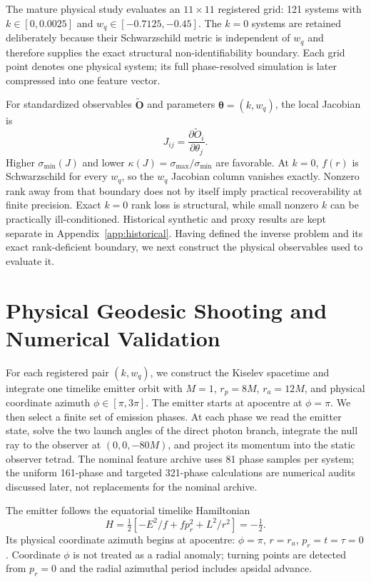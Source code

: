\documentclass[11pt]{article}
\newcommand{\wq}{w_q}
\newcommand{\smin}{\sigma_{\min}}
\newcommand{\kappaJ}{\kappa(J)}
\begin{document}
The mature physical study evaluates an $11\times11$ registered grid: 121
systems with $k\in[0,0.0025]$ and
$\wq\in[-0.7125,-0.45]$. The $k=0$ systems are retained deliberately because
their Schwarzschild metric is independent of $\wq$ and therefore supplies the
exact structural non-identifiability boundary. Each grid point denotes one
physical system; its full phase-resolved simulation is later compressed into
one feature vector.

For standardized observables $\tilde{\mathbf O}$ and parameters
$\boldsymbol\theta=(k,\wq)$, the local Jacobian is
\begin{equation}
 J_{ij}=\frac{\partial\tilde O_i}{\partial\theta_j}.
\end{equation}
Higher $\smin(J)$ and lower $\kappaJ=\sigma_{\max}/\smin$ are favorable. At
$k=0$, $f(r)$ is Schwarzschild for every $\wq$, so the $\wq$ Jacobian column
vanishes exactly. Nonzero rank away from that boundary does not by itself imply
practical recoverability at finite precision. Exact $k=0$ rank loss is
structural, while small nonzero $k$ can be practically ill-conditioned.
Historical synthetic and proxy results are kept separate in
Appendix~\ref{app:historical}. Having defined the inverse problem and its exact
rank-deficient boundary, we next construct the physical observables used to
evaluate it.

\section{Physical Geodesic Shooting and Numerical Validation}
For each registered pair $(k,\wq)$, we construct the Kiselev spacetime and
integrate one timelike emitter orbit with $M=1$, $r_p=8M$, $r_a=12M$, and
physical coordinate azimuth $\phi\in[\pi,3\pi]$. The emitter starts at
apocentre at $\phi=\pi$. We then select a finite set of emission phases. At
each phase we read the emitter state, solve the two launch angles of the direct
photon branch, integrate the null ray to the observer at $(0,0,-80M)$, and
project its momentum into the static observer tetrad. The nominal feature
archive uses 81 phase samples per system; the uniform 161-phase and targeted
321-phase calculations are numerical audits discussed later, not replacements
for the nominal archive.

The emitter follows the equatorial timelike Hamiltonian
\begin{equation}
 H=\tfrac12[-E^2/f+fp_r^2+L^2/r^2]=-\tfrac12.
\end{equation}
Its physical coordinate azimuth begins at apocentre:
$\phi=\pi$, $r=r_a$, $p_r=t=\tau=0$. Coordinate $\phi$ is not treated as a
radial anomaly; turning points are detected from $p_r=0$ and the radial
azimuthal period includes apsidal advance.
\end{document}
